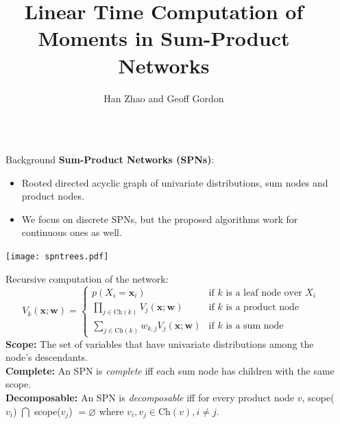 \documentclass[final,20pt]{beamer}
\title{Linear Time Computation of Moments in Sum-Product Networks}
\author{Han Zhao and Geoff Gordon}
\institute{Machine Learning Department, Carnegie Mellon University}
\newlength{\sepwid}
\newlength{\onecolwid}
\begin{document}

\setlength{\belowcaptionskip}{1ex} %
\setlength\belowdisplayshortskip{1ex} %

\begin{frame}[t] %

\begin{columns}[t] %

\begin{column}{\sepwid}\end{column} %

\begin{column}{\onecolwid} %
\vspace*{-0.5in}
\begin{block}{Background}
\textcolor{CMURed}{\textbf{Sum-Product Networks (SPNs)}:}
\begin{itemize}
    \item   Rooted directed acyclic graph of univariate distributions, sum nodes and product nodes.
    \item   We focus on discrete SPNs, but the proposed algorithms work for continuous ones as well.
\end{itemize}
\texttt{[image: spntrees.pdf]}

Recursive computation of the network: 
\begin{equation*}
V_k(\mathbf{x};\mathbf{w}) = 
\begin{cases}
p(X_i = \mathbf{x}_i) & \text{if $k$ is a leaf node over $X_i$} \\
\prod_{j \in \text{Ch}(k)} V_j(\mathbf{x};\mathbf{w}) & \text{if $k$ is a product node} \\
\sum_{j\in \text{Ch}(k)} w_{k,j} V_j(\mathbf{x};\mathbf{w}) & \text{if $k$ is a sum node}
\end{cases} 
\end{equation*}
\textcolor{CMURed}{\textbf{Scope:}} The set of variables that have univariate distributions among the node's descendants. \\
\textcolor{CMURed}{\textbf{Complete:}} An SPN is \emph{complete} iff each sum node has children with the same scope.\\
\textcolor{CMURed}{\textbf{Decomposable:}} An SPN is \emph{decomposable} iff for every product node $v$, scope($v_i$) $\bigcap$ scope($v_j$) $=\varnothing$ where $v_i, v_j\in \text{Ch}(v), i\neq j$. 
\end{block}


\end{column}
\end{columns}
\end{frame}
\end{document}
